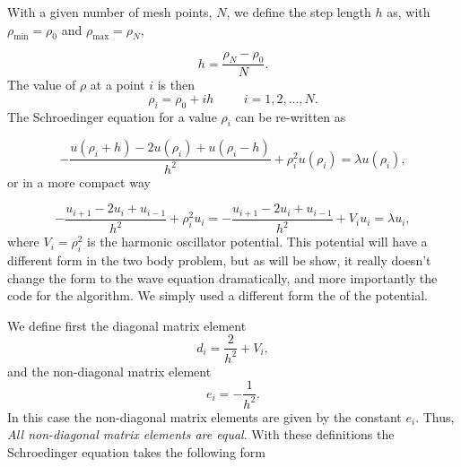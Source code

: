 \documentclass[10pt,showpacs,preprintnumbers,footinbib,amsmath,amssymb,aps,prl,twocolumn,groupedaddress,superscriptaddress,showkeys]{revtex4-1}
\begin{document}
With a given number of mesh points, $N$, we 
define the step length $h$ as, with $\rho_{\mathrm{min}}=\rho_0$  and $\rho_{\mathrm{max}}=\rho_N$,

\begin{equation*}
  h=\frac{\rho_N-\rho_0 }{N}.
\end{equation*}
The value of $\rho$ at a point $i$ is then 
\[
    \rho_i= \rho_0 + ih \hspace{1cm} i=1,2,\dots , N.
\]
The Schroedinger equation for a value $\rho_i$ can be re-written as

\[
-\frac{u(\rho_i+h) -2u(\rho_i) +u(\rho_i-h)}{h^2}+\rho_i^2u(\rho_i)  = \lambda u(\rho_i),
\]
or in  a more compact way

\[
-\frac{u_{i+1} -2u_i +u_{i-1}}{h^2}+\rho_i^2u_i=-\frac{u_{i+1} -2u_i +u_{i-1} }{h^2}+V_iu_i  = \lambda u_i,
\]
where $V_i=\rho_i^2$ is the harmonic oscillator potential. This potential will have a different form in the two body problem, but as will be show, it really doesn't change the form to the wave equation dramatically, and more importantly the code for the algorithm. We simply used a different form the of the potential.

We define first the diagonal matrix element
\begin{equation*}
   d_i=\frac{2}{h^2}+V_i,
\end{equation*}
and the non-diagonal matrix element
\begin{equation*}
   e_i=-\frac{1}{h^2}.
\end{equation*}
In this case the non-diagonal matrix elements are given by the constant $e_i$. Thus,
\emph{All non-diagonal matrix elements are equal}.
With these definitions the Schroedinger equation takes the following form
\end{document}

